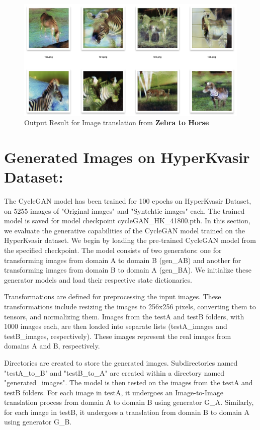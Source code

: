 \documentclass[UKenglish,12pt]{master-style}
\begin{document}
\begin{figure}[htbp]
    \centering
    \includegraphics[width=1\textwidth]{Images/test_zebra_horse.png}
    \caption{Output Result for Image translation from \textbf{Zebra to Horse}}
    \label{fig:test_zebra_horse}
\end{figure}

\section{Generated Images on HyperKvasir Dataset:}


The CycleGAN model has been trained for 100 epochs on HyperKvasir Dataset, on 5255 images of "Original images" and "Syntehtic images" each. The trained model is saved for model checkpoint cycleGAN\_HK\_41800.pth. In this section, we evaluate the generative capabilities of the CycleGAN model trained on the HyperKvasir dataset. We begin by loading the pre-trained CycleGAN model from the specified checkpoint. The model consists of two generators: one for transforming images from domain A to domain B (gen\_AB) and another for transforming images from domain B to domain A (gen\_BA). We initialize these generator models and load their respective state dictionaries.

Transformations are defined for preprocessing the input images. These transformations include resizing the images to 256x256 pixels, converting them to tensors, and normalizing them. Images from the testA and testB folders, with 1000 images each, are then loaded into separate lists (testA\_images and testB\_images, respectively). These images represent the real images from domains A and B, respectively.

Directories are created to store the generated images. Subdirectories named "testA\_to\_B" and "testB\_to\_A" are created within a directory named "generated\_images". The model is then tested on the images from the testA and testB folders. For each image in testA, it undergoes an Image-to-Image translation process from domain A to domain B using generator G\_A. Similarly, for each image in testB, it undergoes a translation from domain B to domain A using generator G\_B.
\end{document}
